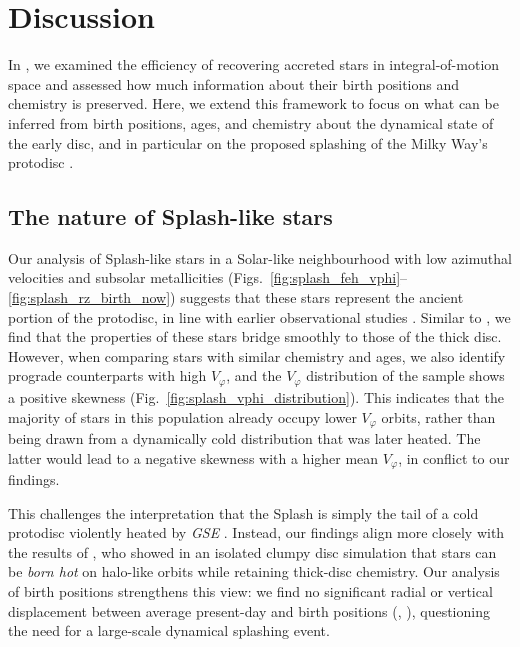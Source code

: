 \documentclass[fleqn,usenatbib]{mnras}
\begin{document}
\section{Discussion}
\label{sec:discussion}

In , we examined the efficiency of recovering accreted stars in integral-of-motion space and assessed how much information about their birth positions and chemistry is preserved. Here, we extend this framework to focus on what can be inferred from birth positions, ages, and chemistry about the dynamical state of the early disc, and in particular on the proposed splashing of the Milky Way's protodisc \citep{Belokurov2020}.

\subsection{The nature of Splash-like stars}

Our analysis of Splash-like stars in a Solar-like neighbourhood with low azimuthal velocities and subsolar metallicities (Figs.~\ref{fig:splash_feh_vphi}--\ref{fig:splash_rz_birth_now}) suggests that these stars represent the ancient portion of the protodisc, in line with earlier observational studies \citep{Bonaca2017, Haywood2018, DiMatteo2019, Gallart2019, Belokurov2020}. Similar to \citet{Belokurov2020}, we find that the properties of these stars bridge smoothly to those of the thick disc. However, when comparing stars with similar chemistry and ages, we also identify prograde counterparts with high $V_\varphi$, and the $V_\varphi$ distribution of the sample shows a positive skewness (Fig.~\ref{fig:splash_vphi_distribution}). This indicates that the majority of stars in this population already occupy lower $V_\varphi$ orbits, rather than being drawn from a dynamically cold distribution that was later heated. The latter would lead to a negative skewness with a higher mean $V_\varphi$, in conflict to our findings.

This challenges the interpretation that the Splash is simply the tail of a cold protodisc violently heated by \textit{GSE} \citep{DiMatteo2019, Belokurov2020}. Instead, our findings align more closely with the results of \citet{Amarante2020}, who showed in an isolated clumpy disc simulation that stars can be \emph{born hot} on halo-like orbits while retaining thick-disc chemistry. Our analysis of birth positions strengthens this view: we find no significant radial or vertical displacement between average present-day and birth positions (, ), questioning the need for a large-scale dynamical splashing event.
\end{document}
